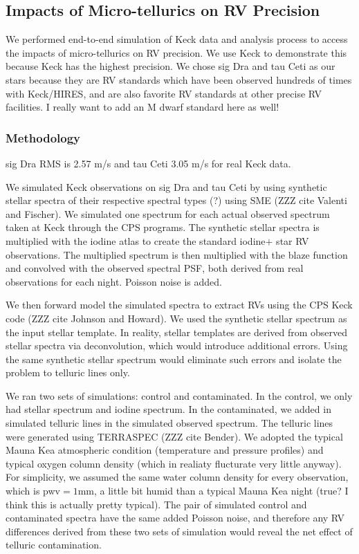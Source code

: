 \subsection{Impacts of Micro-tellurics on RV Precision}\label{keck:telluric:method}

We performed end-to-end simulation of Keck data and analysis process
to access the impacts of micro-tellurics on RV precision. We use Keck
to demonstrate this because Keck has the highest precision. We chose
sig Dra and tau Ceti as our stars because they are RV standards which
have been observed hundreds of times with Keck/HIRES, and are also
favorite RV standards at other precise RV facilities. I really want to
add an M dwarf standard here as well!


\subsubsection{Methodology}

sig Dra RMS is 2.57 m/s and tau Ceti 3.05 m/s for real Keck data.

We simulated Keck observations on sig Dra and tau Ceti by using
synthetic stellar spectra of their respective spectral types (?) using
SME (ZZZ cite Valenti and Fischer). We simulated one spectrum for each
actual observed spectrum taken at Keck through the CPS programs. The
synthetic stellar spectra is multiplied with the iodine atlas to
create the standard iodine$+$ star RV observations. The multiplied
spectrum is then multiplied with the blaze function and convolved with
the observed spectral PSF, both derived from real observations for
each night. Poisson noise is added.

We then forward model the simulated spectra to extract RVs using the
CPS Keck code (ZZZ cite Johnson and Howard). We used the synthetic
stellar spectrum as the input stellar template. In reality, stellar
templates are derived from observed stellar spectra via deconvolution,
which would introduce additional errors. Using the same synthetic
stellar spectrum would eliminate such errors and isolate the problem
to telluric lines only.

We ran two sets of simulations: control and contaminated. In the
control, we only had stellar spectrum and iodine spectrum. In the
contaminated, we added in simulated telluric lines in the simulated
observed spectrum. The telluric lines were generated using TERRASPEC
(ZZZ cite Bender). We adopted the typical Mauna Kea atmospheric
condition (temperature and pressure profiles) and typical oxygen
column density (which in realiaty flucturate very little anyway). For
simplicity, we assumed the same water column density for every
observation, which is pwv$=1$mm, a little bit humid than a typical
Mauna Kea night (true? I think this is actually pretty typical). The
pair of simulated control and contaminated spectra have the same added
Poisson noise, and therefore any RV differences derived from these two
sets of simulation would reveal the net effect of telluric
contamination.


